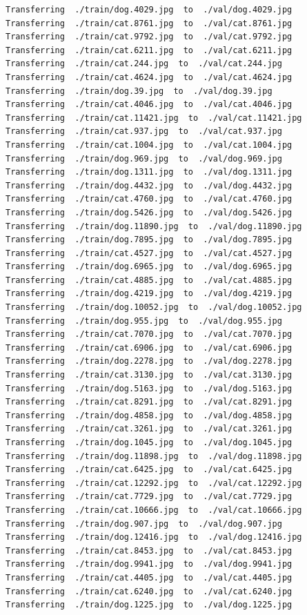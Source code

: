 \documentclass[]{book}
\theoremstyle{definition}
\theoremstyle{definition}
\theoremstyle{definition}
\theoremstyle{remark}
\begin{document}
\begin{verbatim}
Transferring  ./train/dog.4029.jpg  to  ./val/dog.4029.jpg
Transferring  ./train/cat.8761.jpg  to  ./val/cat.8761.jpg
Transferring  ./train/cat.9792.jpg  to  ./val/cat.9792.jpg
Transferring  ./train/cat.6211.jpg  to  ./val/cat.6211.jpg
Transferring  ./train/cat.244.jpg  to  ./val/cat.244.jpg
Transferring  ./train/cat.4624.jpg  to  ./val/cat.4624.jpg
Transferring  ./train/dog.39.jpg  to  ./val/dog.39.jpg
Transferring  ./train/cat.4046.jpg  to  ./val/cat.4046.jpg
Transferring  ./train/cat.11421.jpg  to  ./val/cat.11421.jpg
Transferring  ./train/cat.937.jpg  to  ./val/cat.937.jpg
Transferring  ./train/cat.1004.jpg  to  ./val/cat.1004.jpg
Transferring  ./train/dog.969.jpg  to  ./val/dog.969.jpg
Transferring  ./train/dog.1311.jpg  to  ./val/dog.1311.jpg
Transferring  ./train/dog.4432.jpg  to  ./val/dog.4432.jpg
Transferring  ./train/cat.4760.jpg  to  ./val/cat.4760.jpg
Transferring  ./train/dog.5426.jpg  to  ./val/dog.5426.jpg
Transferring  ./train/dog.11890.jpg  to  ./val/dog.11890.jpg
Transferring  ./train/dog.7895.jpg  to  ./val/dog.7895.jpg
Transferring  ./train/cat.4527.jpg  to  ./val/cat.4527.jpg
Transferring  ./train/dog.6965.jpg  to  ./val/dog.6965.jpg
Transferring  ./train/cat.4885.jpg  to  ./val/cat.4885.jpg
Transferring  ./train/dog.4219.jpg  to  ./val/dog.4219.jpg
Transferring  ./train/dog.10052.jpg  to  ./val/dog.10052.jpg
Transferring  ./train/dog.955.jpg  to  ./val/dog.955.jpg
Transferring  ./train/cat.7070.jpg  to  ./val/cat.7070.jpg
Transferring  ./train/cat.6906.jpg  to  ./val/cat.6906.jpg
Transferring  ./train/dog.2278.jpg  to  ./val/dog.2278.jpg
Transferring  ./train/cat.3130.jpg  to  ./val/cat.3130.jpg
Transferring  ./train/dog.5163.jpg  to  ./val/dog.5163.jpg
Transferring  ./train/cat.8291.jpg  to  ./val/cat.8291.jpg
Transferring  ./train/dog.4858.jpg  to  ./val/dog.4858.jpg
Transferring  ./train/cat.3261.jpg  to  ./val/cat.3261.jpg
Transferring  ./train/dog.1045.jpg  to  ./val/dog.1045.jpg
Transferring  ./train/dog.11898.jpg  to  ./val/dog.11898.jpg
Transferring  ./train/cat.6425.jpg  to  ./val/cat.6425.jpg
Transferring  ./train/cat.12292.jpg  to  ./val/cat.12292.jpg
Transferring  ./train/cat.7729.jpg  to  ./val/cat.7729.jpg
Transferring  ./train/cat.10666.jpg  to  ./val/cat.10666.jpg
Transferring  ./train/dog.907.jpg  to  ./val/dog.907.jpg
Transferring  ./train/dog.12416.jpg  to  ./val/dog.12416.jpg
Transferring  ./train/cat.8453.jpg  to  ./val/cat.8453.jpg
Transferring  ./train/dog.9941.jpg  to  ./val/dog.9941.jpg
Transferring  ./train/cat.4405.jpg  to  ./val/cat.4405.jpg
Transferring  ./train/cat.6240.jpg  to  ./val/cat.6240.jpg
Transferring  ./train/dog.1225.jpg  to  ./val/dog.1225.jpg

\end{verbatim}
\end{document}
